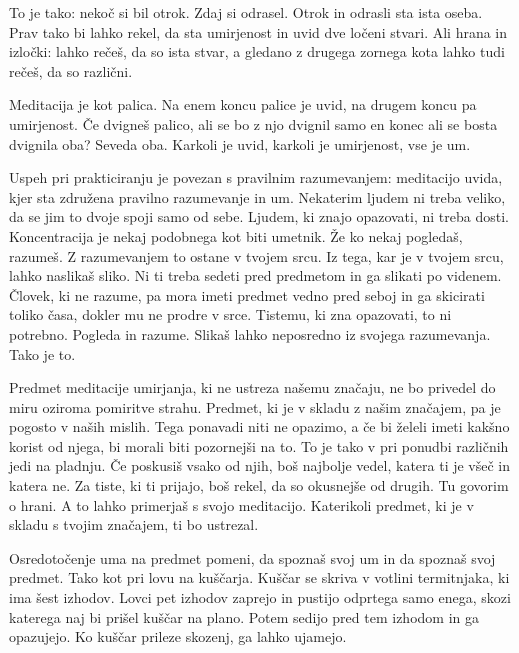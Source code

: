 To je tako: nekoč si bil otrok. Zdaj si odrasel. Otrok in odrasli sta ista oseba. Prav tako bi lahko rekel, da sta umirjenost in uvid dve ločeni stvari. Ali hrana in izločki: lahko rečeš, da so ista stvar, a gledano z drugega zornega kota lahko tudi rečeš, da so različni.

\clearpage


Meditacija je kot palica. Na enem koncu palice je uvid, na drugem koncu pa umirjenost. Če dvigneš palico, ali se bo z njo dvignil samo en konec ali se bosta dvignila oba? Seveda oba. Karkoli je uvid, karkoli je umirjenost, vse je um.


Uspeh pri prakticiranju je povezan s pravilnim razumevanjem: meditacijo uvida, kjer sta združena pravilno razumevanje in um. Nekaterim ljudem ni treba veliko, da se jim to dvoje spoji samo od sebe. Ljudem, ki znajo opazovati, ni treba dosti. Koncentracija je nekaj podobnega kot biti umetnik. Že ko nekaj pogledaš, razumeš. Z razumevanjem to ostane v tvojem srcu. Iz tega, kar je v tvojem srcu, lahko naslikaš sliko. Ni ti treba sedeti pred predmetom in ga slikati po videnem. Človek, ki ne razume, pa mora imeti predmet vedno pred seboj in ga skicirati toliko časa, dokler mu ne prodre v srce. Tistemu, ki zna opazovati, to ni potrebno. Pogleda in razume. Slikaš lahko neposredno iz svojega razumevanja. Tako je to.

\clearpage


Predmet meditacije umirjanja, ki ne ustreza našemu značaju, ne bo privedel do miru oziroma pomiritve strahu. Predmet, ki je v skladu z našim značajem, pa je pogosto v naših mislih. Tega ponavadi niti ne opazimo, a če bi želeli imeti kakšno korist od njega, bi morali biti pozornejši na to. To je tako v pri ponudbi različnih jedi na pladnju. Če poskusiš vsako od njih, boš najbolje vedel, katera ti je všeč in katera ne. Za tiste, ki ti prijajo, boš rekel, da so okusnejše od drugih. Tu govorim o hrani. A to lahko primerjaš s svojo meditacijo. Katerikoli predmet, ki je v skladu s tvojim značajem, ti bo ustrezal.

\clearpage


Osredotočenje uma na predmet pomeni, da spoznaš svoj um in da spoznaš svoj predmet. Tako kot pri lovu na kuščarja. Kuščar se skriva v votlini termitnjaka, ki ima šest izhodov. Lovci pet izhodov zaprejo in pustijo odprtega samo enega, skozi katerega naj bi prišel kuščar na plano. Potem sedijo pred tem izhodom in ga opazujejo. Ko kuščar prileze skozenj, ga lahko ujamejo.

